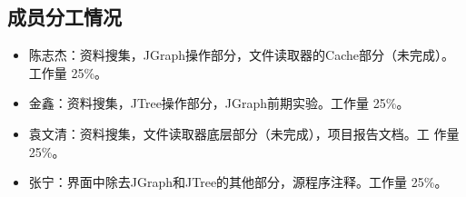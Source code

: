 \documentclass[a4paper,unicode=true,xetex]{article}
\begin{document}
\subsection{成员分工情况}

\begin{itemize}
\item 陈志杰：资料搜集，JGraph操作部分，文件读取器的Cache部分（未完成）。
  工作量 25\%。
\item 金鑫：资料搜集，JTree操作部分，JGraph前期实验。工作量 25\%。
\item 袁文清：资料搜集，文件读取器底层部分（未完成），项目报告文档。工
  作量 25\%。
\item 张宁：界面中除去JGraph和JTree的其他部分，源程序注释。工作量 25\%。
\end{itemize}
\end{document}
